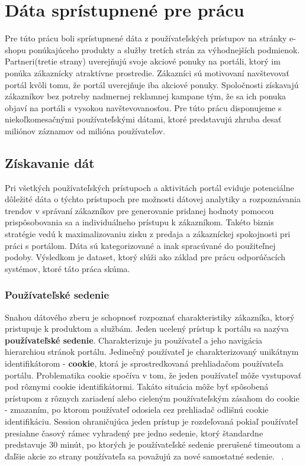 \chapter{Dáta sprístupnené pre prácu}
\label{analyza_data}

Pre túto prácu boli sprístupnené dáta z používateľských prístupov na stránky e-shopu ponúkajúceho produkty a služby tretích strán za výhodnejších podmienok. Partneri(tretie strany) uverejňujú svoje akciové ponuky na portáli, ktorý im ponúka zákaznícky atraktívne prostredie. Zákazníci sú motivovaní navštevovať portál kvôli tomu, že portál uverejňuje iba akciové ponuky. Spoločnosti získavajú zákazníkov bez potreby nadmernej reklamnej kampane tým, že sa ich ponuka objaví na portáli s vysokou navštevovanosťou. Pre túto prácu disponujeme s niekoľkomesačnými používateľskými dátami, ktoré predstavujú zhruba desať miliónov záznamov od milióna používateľov.

\section{Získavanie dát}
\label{analyza_ziskavanie_dat}

Pri všetkých používateľských prístupoch a aktivitách portál eviduje potenciálne dôležité dáta o týchto prístupoch pre možnosti dátovej analytiky a rozpoznávania trendov v správaní zákazníkov pre generovanie pridanej hodnoty pomocou prispôsobovania sa a individuálneho prístupu k zákazníkom. Takéto biznis stratégie vedú k maximalizovaniu zisku z predaja a zákazníckej spokojnosti pri práci s portálom. Dáta sú kategorizované a inak spracúvané do použiteľnej podoby. Výsledkom je dataset, ktorý slúži ako základ pre prácu odporúčacích systémov, ktoré táto práca skúma.

\subsection{Používateľské sedenie}
\label{session}
Snahou dátového zberu je schopnosť rozpoznať charakteristiky zákazníka, ktorý pristupuje k produktom a službám. Jeden ucelený prístup k portálu sa nazýva \textbf{používateľské sedenie}. Charakterizuje ju používateľ a jeho navigácia hierarchiou stránok portálu. Jedinečný používateľ je charakterizovaný unikátnym identifikátorom - \textbf{cookie}, ktorá je sprostredkovaná prehliadačom používateľa portálu. Problematika cookie spočíva v tom, že jeden používateľ môže vystupovať pod rôznymi cookie identifikátormi. Takáto situácia môže byť spôsobená prístupom z rôznych zariadení alebo cieleným používateľským zásahom do cookie - zmazaním, po ktorom používateľ odosiela cez prehliadač odlišnú cookie identifikáciu. Session ohraničujúca jeden prístup je rozdeľovaná pokiaľ používateľ presiahne časový rámec vyhradený pre jedno sedenie, ktorý štandardne predstavuje 30 minút, po ktorých je používateľské sedenie prerušené timeoutom a ďaľšie akcie zo strany používateľa sa považujú za nové samostatné sedenie.  ~\cite{zhou2010research}.

